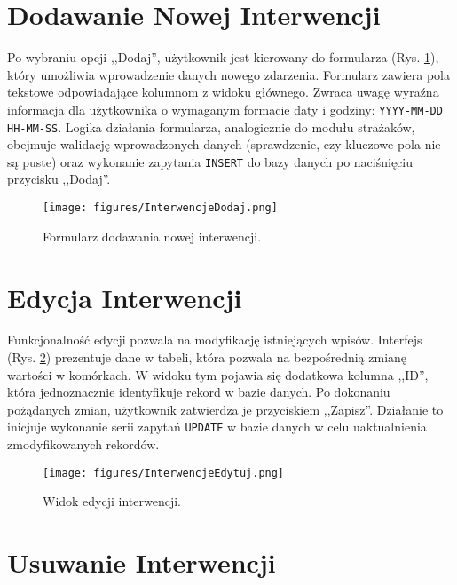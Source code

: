 \section*{Dodawanie Nowej Interwencji}
\label{sec:interwencje_dodaj}

Po wybraniu opcji ,,Dodaj'', użytkownik jest kierowany do formularza (Rys. \ref{fig:interwencje_dodaj_form}), który umożliwia wprowadzenie danych nowego zdarzenia. Formularz zawiera pola tekstowe odpowiadające kolumnom z widoku głównego. Zwraca uwagę wyraźna informacja dla użytkownika o wymaganym formacie daty i godziny: \texttt{YYYY-MM-DD HH-MM-SS}. Logika działania formularza, analogicznie do modułu strażaków, obejmuje walidację wprowadzonych danych (sprawdzenie, czy kluczowe pola nie są puste) oraz wykonanie zapytania \texttt{INSERT} do bazy danych po naciśnięciu przycisku ,,Dodaj''.

\begin{figure}[H]
	\centering
	\texttt{[image: figures/InterwencjeDodaj.png]}
	\caption{Formularz dodawania nowej interwencji.}
	\label{fig:interwencje_dodaj_form}
\end{figure}

\section*{Edycja Interwencji}
\label{sec:interwencje_edycja}

Funkcjonalność edycji pozwala na modyfikację istniejących wpisów. Interfejs (Rys. \ref{fig:interwencje_edycja_widok}) prezentuje dane w tabeli, która pozwala na bezpośrednią zmianę wartości w komórkach. W widoku tym pojawia się dodatkowa kolumna ,,ID'', która jednoznacznie identyfikuje rekord w bazie danych. Po dokonaniu pożądanych zmian, użytkownik zatwierdza je przyciskiem ,,Zapisz''. Działanie to inicjuje wykonanie serii zapytań \texttt{UPDATE} w bazie danych w celu uaktualnienia zmodyfikowanych rekordów.

\begin{figure}[H]
    \centering
    \texttt{[image: figures/InterwencjeEdytuj.png]}
    \caption{Widok edycji interwencji.}
    \label{fig:interwencje_edycja_widok}
\end{figure}

\section*{Usuwanie Interwencji}
\label{sec:interwencje_usuniecie}

